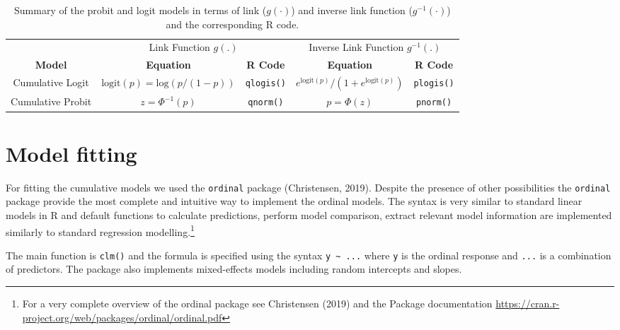 \documentclass[
  man,floatsintext]{apa6}
\begin{document}
\normalsize

\scriptsize

\normalsize

\scriptsize

\begin{table}
\centering
\caption{\label{tab:tab-model-summary-latex}Summary of the probit and logit models in terms of link (\(g(\cdot)\)) and inverse link function (\(g^{-1}(\cdot)\)) and the corresponding R code.}
\centering
\begin{tabular}[t]{ccccc}
\toprule
\multicolumn{1}{c}{} & \multicolumn{2}{c}{Link Function $g(.)$} & \multicolumn{2}{c}{Inverse Link Function $g^{-1}(.)$} \\
\cmidrule(l{3pt}r{3pt}){2-3} \cmidrule(l{3pt}r{3pt}){4-5}
\textbf{Model} & \textbf{Equation} & \textbf{R Code} & \textbf{Equation} & \textbf{R Code}\\
\midrule
Cumulative Logit & $\text{logit}(p) = \text{log}(p / (1-p))$ & \texttt{qlogis()} & $e^{\text{logit}(p)} / (1 + e^{\text{logit}(p)})$ & \texttt{plogis()}\\
Cumulative Probit & $z = \Phi^{-1}(p)$ & \texttt{qnorm()} & $p = \Phi(z)$ & \texttt{pnorm()}\\
\bottomrule
\end{tabular}
\end{table}

\normalsize

\scriptsize

\normalsize

\section{Model fitting}\label{model-fitting}

For fitting the cumulative models we used the \texttt{ordinal} package (Christensen, 2019). Despite the presence of other possibilities the \texttt{ordinal} package provide the most complete and intuitive way to implement the ordinal models. The syntax is very similar to standard linear models in R and default functions to calculate predictions, perform model comparison, extract relevant model information are implemented similarly to standard regression modelling.\footnote{For a very complete overview of the ordinal package see Christensen (2019) and the Package documentation \url{https://cran.r-project.org/web/packages/ordinal/ordinal.pdf}}

The main function is \texttt{clm()} and the formula is specified using the syntax \texttt{y\ \textasciitilde{}\ ...} where \texttt{y} is the ordinal response and \texttt{...} is a combination of predictors. The package also implements mixed-effects models including random intercepts and slopes.
\end{document}
